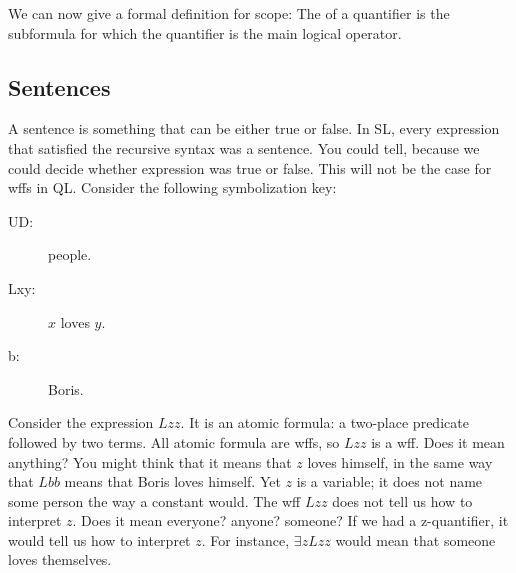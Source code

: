 We can now give a formal definition for scope: The  of a quantifier is the subformula for which the quantifier is the main logical operator. 






\subsection{Sentences}

A {sentence} is something that can be either true or false. In SL, every expression that satisfied the recursive syntax was a sentence. You could tell, because we could decide whether expression was true or false. This will not be the case for wffs in QL. Consider the following symbolization key:

\begin{description}
\item[UD:] people.
\item[Lxy:] $x$ loves $y$.
\item[b:] Boris.
\end{description}

Consider the expression $Lzz$. It is an atomic formula: a two-place predicate followed by two terms. All atomic formula are wffs, so $Lzz$ is a wff. Does it mean anything? You might think that it means that $z$ loves himself, in the same way that $Lbb$ means that Boris loves himself. Yet $z$ is a variable; it does not name some person the way a constant would. The wff $Lzz$ does not tell us how to interpret $z$. Does it mean everyone? anyone? someone? If we had a z-quantifier, it would tell us how to interpret $z$. For instance, $\exists zLzz$ would mean that someone loves themselves.

